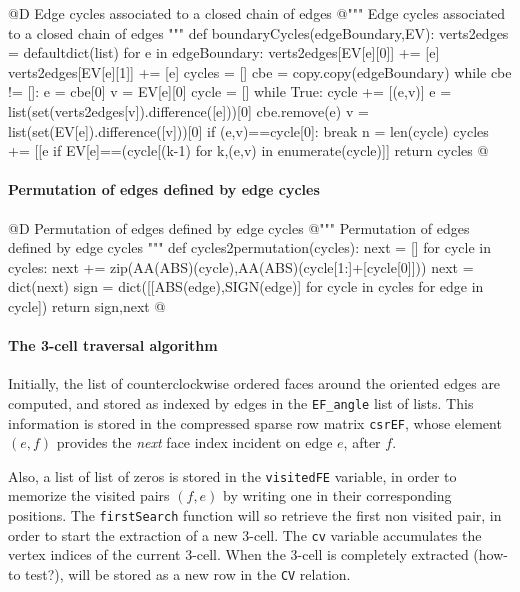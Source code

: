 \documentclass[11pt,oneside]{article}    %
\begin{document}
@D Edge cycles associated to a closed chain of edges
@{""" Edge cycles associated to a closed chain of edges """
def boundaryCycles(edgeBoundary,EV):
    verts2edges = defaultdict(list)
    for e in edgeBoundary:
        verts2edges[EV[e][0]] += [e]
        verts2edges[EV[e][1]] += [e]
    cycles = []
    cbe = copy.copy(edgeBoundary)
    while cbe != []:
        e = cbe[0]
        v = EV[e][0]
        cycle = []
        while True:
            cycle += [(e,v)]
            e = list(set(verts2edges[v]).difference([e]))[0]
            cbe.remove(e)
            v = list(set(EV[e]).difference([v]))[0]
            if (e,v)==cycle[0]:
                break
        n = len(cycle)
        cycles += [[e if EV[e]==(cycle[(k-1)%
            for k,(e,v) in enumerate(cycle)]]
    return cycles
@}



\paragraph{Permutation of edges defined by edge cycles}
   
@D Permutation of edges defined by edge cycles
@{""" Permutation of edges defined by edge cycles """
def cycles2permutation(cycles):
    next = []
    for cycle in cycles:
        next += zip(AA(ABS)(cycle),AA(ABS)(cycle[1:]+[cycle[0]]))
    next = dict(next)
    sign = dict([[ABS(edge),SIGN(edge)] for cycle in cycles for edge in cycle])
    return sign,next
@}





\paragraph{The 3-cell traversal algorithm}
Initially, the list of counterclockwise ordered faces around the oriented edges are computed, and stored as indexed by edges in the \texttt{EF\_angle} list of lists. This information is stored in the compressed sparse row matrix \texttt{csrEF}, whose element $(e,f)$ provides the \emph{next} face index  incident on edge $e$, after $f$. 

Also, a list of list of zeros is stored in the \texttt{visitedFE} variable, in order to memorize the visited pairs $(f,e)$ by writing one in their corresponding positions. The \texttt{firstSearch} function will so retrieve the first non visited pair, in order to start the extraction of a new 3-cell. The \texttt{cv} variable accumulates the vertex indices of the current 3-cell. When the 3-cell is completely extracted (how-to test?), will be stored as a new row in the \texttt{CV} relation. 
\end{document}
